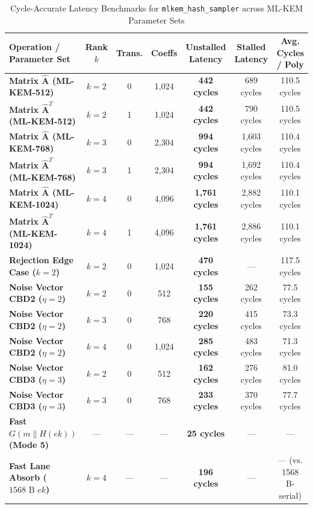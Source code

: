 \begin{table}[!t]
\caption{Cycle-Accurate Latency Benchmarks for \texttt{mlkem\_hash\_sampler} across ML-KEM Parameter Sets}
\label{tab:cycle_benchmarks}
\centering
\footnotesize
\begin{tabular*}{\textwidth}{@{\extracolsep{\fill}} lcccccc @{}}
\toprule
\textbf{Operation / Parameter Set} & \textbf{Rank $k$} & \textbf{Trans.} & \textbf{Coeffs} & \textbf{Unstalled Latency} & \textbf{Stalled Latency} & \textbf{Avg. Cycles / Poly} \\
\midrule
\textbf{Matrix $\hat{\mathbf{A}}$ (ML-KEM-512)}  & $k=2$ & 0 & 1,024 & \textbf{442 cycles}  & 689 cycles  & 110.5 cycles \\
\textbf{Matrix $\hat{\mathbf{A}}^T$ (ML-KEM-512)} & $k=2$ & 1 & 1,024 & \textbf{442 cycles}  & 790 cycles  & 110.5 cycles \\
\textbf{Matrix $\hat{\mathbf{A}}$ (ML-KEM-768)}  & $k=3$ & 0 & 2,304 & \textbf{994 cycles}  & 1,603 cycles & 110.4 cycles \\
\textbf{Matrix $\hat{\mathbf{A}}^T$ (ML-KEM-768)} & $k=3$ & 1 & 2,304 & \textbf{994 cycles}  & 1,692 cycles & 110.4 cycles \\
\textbf{Matrix $\hat{\mathbf{A}}$ (ML-KEM-1024)} & $k=4$ & 0 & 4,096 & \textbf{1,761 cycles} & 2,882 cycles & 110.1 cycles \\
\textbf{Matrix $\hat{\mathbf{A}}^T$ (ML-KEM-1024)}& $k=4$ & 1 & 4,096 & \textbf{1,761 cycles} & 2,886 cycles & 110.1 cycles \\
\textbf{Rejection Edge Case ($k=2$)}             & $k=2$ & 0 & 1,024 & \textbf{470 cycles}  & ---         & 117.5 cycles \\
\midrule
\textbf{Noise Vector CBD2 ($\eta=2$)}           & $k=2$ & 0 & 512   & \textbf{155 cycles}  & 262 cycles  & 77.5 cycles \\
\textbf{Noise Vector CBD2 ($\eta=2$)}           & $k=3$ & 0 & 768   & \textbf{220 cycles}  & 415 cycles  & 73.3 cycles \\
\textbf{Noise Vector CBD2 ($\eta=2$)}           & $k=4$ & 0 & 1,024 & \textbf{285 cycles}  & 483 cycles  & 71.3 cycles \\
\textbf{Noise Vector CBD3 ($\eta=3$)}           & $k=2$ & 0 & 512   & \textbf{162 cycles}  & 276 cycles  & 81.0 cycles \\
\textbf{Noise Vector CBD3 ($\eta=3$)}           & $k=3$ & 0 & 768   & \textbf{233 cycles}  & 370 cycles  & 77.7 cycles \\
\midrule
\textbf{Fast $G(m \parallel H(ek))$ (Mode 5)} & --- & --- & --- & \textbf{25 cycles}   & ---         & --- \\
\textbf{Fast Lane Absorb ($1568\text{ B } ek$)} & $k=4$ & --- & --- & \textbf{196 cycles}  & ---         & --- (vs. 1568 B-serial) \\
\bottomrule
\end{tabular*}
\end{table}

